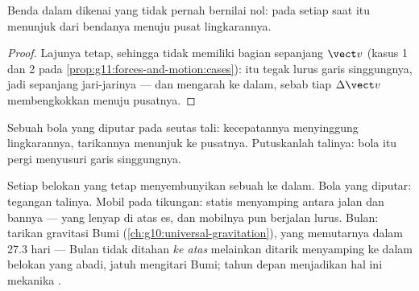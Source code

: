 \begin{proposition}\label{prop:g11:forces-and-motion:inward}
Benda dalam  dikenai  yang tidak
pernah bernilai nol: pada setiap saat  itu menunjuk dari bendanya
menuju pusat lingkarannya.
\end{proposition}

\begin{proof}
Lajunya tetap, sehingga  tidak memiliki bagian sepanjang
$\vect v$ (kasus 1 dan 2 pada
\cref{prop:g11:forces-and-motion:cases}):  itu tegak lurus
garis singgungnya, jadi sepanjang jari-jarinya --- dan mengarah ke
dalam, sebab tiap $\Delta \vect v$ membengkokkan  menuju
pusatnya.
\end{proof}

\begin{omfigure}

{\small Sebuah bola yang diputar pada seutas tali: kecepatannya
menyinggung lingkarannya, tarikannya menunjuk ke pusatnya. Putuskanlah
talinya: bola itu pergi menyusuri garis singgungnya.}
\end{omfigure}

\begin{example}\label{ex:g11:forces-and-motion:moon}
Setiap belokan yang tetap menyembunyikan sebuah  ke dalam. Bola yang
diputar: tegangan talinya. Mobil pada tikungan:  statis
menyamping antara jalan dan bannya --- yang lenyap di atas es, dan
mobilnya pun berjalan lurus. Bulan: tarikan gravitasi Bumi
(\cref{ch:g10:universal-gravitation}), yang memutarnya dalam
\num{27.3} hari --- Bulan tidak ditahan \emph{ke atas} melainkan ditarik
menyamping ke dalam belokan yang abadi, jatuh mengitari Bumi; tahun
depan menjadikan hal ini mekanika .
\end{example}

